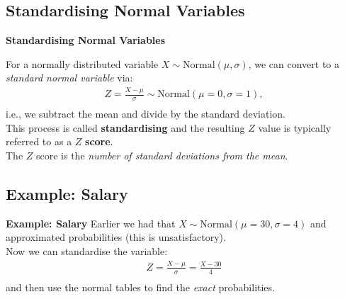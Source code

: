 \documentclass[compress]{beamer}        %
\makeatletter
\newcommand{\tcb}{\textcolor{beamer@blendedblue}}
\makeatother
\begin{document}
\subsection{Standardising Normal Variables}
\begin{frame}{\bf \tcb{Standardising Normal Variables}}

For a normally distributed variable $X \sim \text{Normal}(\mu, \sigma)$, we can convert to a \emph{standard normal variable} via:\\
\begin{align*}
\boxed{Z = \frac{X-\mu}{\sigma}} \sim \text{Normal}(\mu=0, \sigma=1),\\[-0.3cm]
\end{align*}
i.e., we subtract the mean and divide by the standard deviation.\\[0.6cm]

This process is called {\bf standardising} and the resulting $Z$ value is typically referred to as a {\boldmath$Z$} {\bf score}.\\[0.6cm]

The $Z$ score is the \emph{number of standard deviations from the mean}.


\end{frame}



\subsection{Example: Salary}
\begin{frame}{\bf \tcb{Example: Salary}}
Earlier we had that $X \sim \text{Normal}(\mu=30,\sigma=4)$ and approximated probabilities (this is unsatisfactory).\\[0.6cm]

Now we can standardise the variable:\\
\begin{align*}
Z = \frac{X-\mu}{\sigma} = \frac{X-30}{4}\\[-0.2cm]
\end{align*}
and then use the normal tables to find the \emph{exact} probabilities.

\end{frame}
\end{document}
